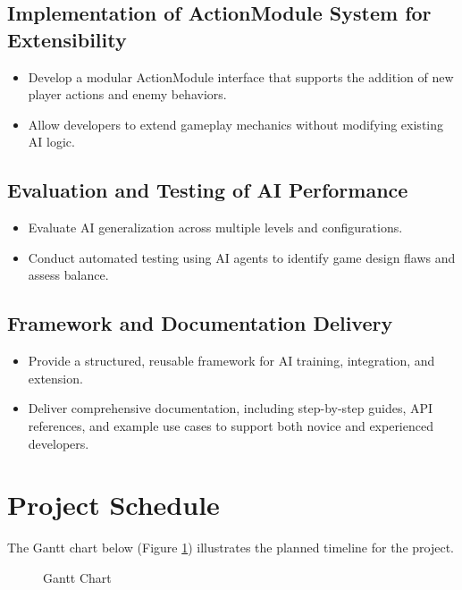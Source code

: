 \documentclass[12pt,oneside,openright,a4paper]{cpe-english-project}
\begin{document}
\subsection{Implementation of ActionModule System for Extensibility}
\begin{itemize}
\item Develop a modular ActionModule interface that supports the addition of new player actions and enemy behaviors.
\item Allow developers to extend gameplay mechanics without modifying existing AI logic.
\end{itemize}
\subsection{Evaluation and Testing of AI Performance}
\begin{itemize}
\item Evaluate AI generalization across multiple levels and configurations.
\item Conduct automated testing using AI agents to identify game design flaws and assess balance.
\end{itemize}
\subsection{Framework and Documentation Delivery}
\begin{itemize}
\item Provide a structured, reusable framework for AI training, integration, and extension.
\item Deliver comprehensive documentation, including step-by-step guides, API references, and example use cases to support both novice and experienced developers.
\end{itemize}
\section{Project Schedule}
The Gantt chart below (Figure \ref{fig:Gantt Chart}) illustrates the planned timeline for the project.
\begin{figure}[H]
\centering
{}
\caption{Gantt Chart}\label{fig:Gantt Chart}
\end{figure}
\end{document}
